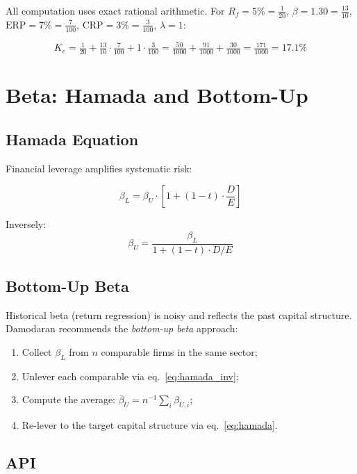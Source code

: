 \documentclass[12pt, a4paper, oneside]{book}
\newcommand{\ERP}{\ensuremath{\mathrm{ERP}}}
\newcommand{\CRP}{\ensuremath{\mathrm{CRP}}}
\newcommand{\Ke}{K_e}
\newcommand{\Rf}{R_f}
\begin{document}
All computation uses exact rational arithmetic. For
$\Rf = 5\% = \frac{1}{20}$, $\beta = 1.30 = \frac{13}{10}$,
$\ERP = 7\% = \frac{7}{100}$, $\CRP = 3\% = \frac{3}{100}$, $\lambda = 1$:

\[
  \Ke
  = \tfrac{1}{20} + \tfrac{13}{10} \cdot \tfrac{7}{100} + 1 \cdot \tfrac{3}{100}
  = \tfrac{50}{1000} + \tfrac{91}{1000} + \tfrac{30}{1000}
  = \tfrac{171}{1000} = 17.1\%
\]

\section{Beta: Hamada and Bottom-Up}

\subsection{Hamada Equation}

Financial leverage amplifies systematic risk:

\begin{equation}
  \beta_L = \beta_U \cdot \left[1 + (1-t) \cdot \frac{D}{E}\right]
  \label{eq:hamada}
\end{equation}

Inversely:
\begin{equation}
  \beta_U = \frac{\beta_L}{1 + (1-t) \cdot D/E}
  \label{eq:hamada_inv}
\end{equation}

\subsection{Bottom-Up Beta}

Historical beta (return regression) is noisy and reflects the past capital
structure. Damodaran recommends the \emph{bottom-up beta} approach:

\begin{enumerate}
  \item Collect $\beta_L$ from $n$ comparable firms in the same sector;
  \item Unlever each comparable via eq.~\eqref{eq:hamada_inv};
  \item Compute the average: $\bar\beta_U = n^{-1}\sum_i \beta_{U,i}$;
  \item Re-lever to the target capital structure via eq.~\eqref{eq:hamada}.
\end{enumerate}

\subsection{API}
\end{document}
